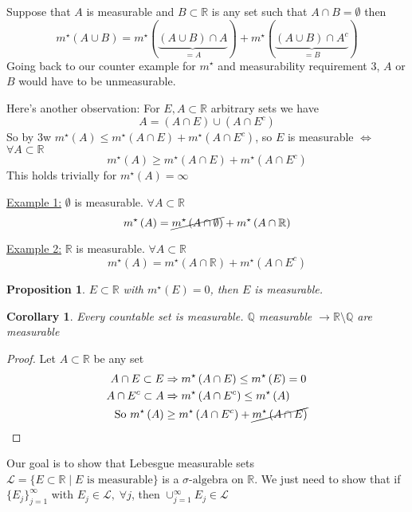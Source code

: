 \documentclass[11pt]{article}
\newtheorem*{prop}{Proposition}
\newtheorem*{*corollary}{Corollary}
\newcommand{\siga}{\sigma\text{-algebra}}
\newcommand{\mstar}[1]{m^{\star}\left(#1\right)}
\begin{document}
    Suppose that $A$ is measurable and $B \subset \mathbb{R}$ is any set such that $A \cap B = \emptyset$ then
    \[
        \mstar{A \cup B} = \mstar{\underbrace{(A \cup B) \cap A}_{=A}} + \mstar{\underbrace{(A \cup B) \cap A^{c}}_{=B}}
    \]
    Going back to our counter example for $m^{\star}$ and measurability requirement 3, $A$ or $B$ would have to be unmeasurable.
    
    Here's another observation: For $E, A \subset \mathbb{R}$ arbitrary sets we have 
    \[
        A = (A \cap E) \cup (A \cap E^{c}) 
    \]
    So by 3w $\mstar{A} \leq \mstar{A \cap E} + \mstar{A \cap E^{c}}$, so $E$ is measurable $\iff$ $\forall A \subset \mathbb{R}$
    \[
        \boxed{\mstar{A} \geq \mstar{A \cap E} + \mstar{A \cap E^{c}}}
    \]
    This holds trivially for $\mstar{A} = \infty$
    
    \underline{Example 1:} $\emptyset$ is measurable.
    $\forall A \subset \mathbb{R}$
    \[
        \mstar{A} = \cancel{\mstar{A \cap \emptyset}} + \mstar{A \cap \mathbb{R}}
    \]

    \underline{Example 2:} $\mathbb{R}$ is measurable.
    $\forall A \subset \mathbb{R}$
    \[
        \mstar{A} = \mstar{A \cap \mathbb{R}} + \mstar{A \cap E^{c}}
    \]

    \begin{prop}
        $E \subset \mathbb{R}$ with $\mstar{E} = 0$, then $E$ is measurable.
    \end{prop}

    \begin{*corollary}
        Every countable set is measurable.
        $\mathbb{Q}$ measurable $\rightarrow \mathbb{R} \setminus \mathbb{Q}$ are measurable
    \end{*corollary}

    \begin{proof}
        Let $A \subset \mathbb{R}$ be any set
        \begin{align*}
            A \cap E \subset E &\Rightarrow \mstar{A \cap E} \leq \mstar{E} = 0 \\
            A \cap E^{c} \subset A &\Rightarrow \mstar{A \cap E^{c}} \leq \mstar{A} \\
            \text{ So } \mstar{A} &\geq \mstar{A \cap E^c} + \cancel{\mstar{A \cap E}}
        \end{align*}
    \end{proof}
    
    Our goal is to show that Lebesgue measurable sets $\mathcal{L} = \{ E \subset \mathbb{R} \mid E \text{ is measurable} \}$ is a $\siga$ on $\mathbb{R}$.
    We just need to show that if $\{ E_j \}_{j=1}^{\infty}$ with $E_j \in \mathcal{L}, \; \forall j$, then $\cup_{j=1}^{\infty} E_j \in \mathcal{L}$
    
\end{document}
